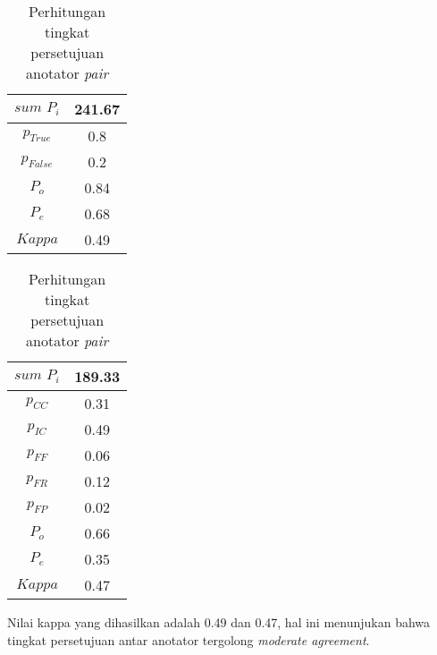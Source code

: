 \begin{table}
  \centering
  \caption{Perhitungan tingkat persetujuan anotator \textit{pair}}
  \label{table:pair-kappa}
  \begin{tabular}{|c|c|}
  \hline
  $sum\,\,P_i$ & 241.67 \\ \hline
  $p_{True}$ & 0.8 \\ \hline
  $p_{False}$ & 0.2 \\ \hline
  $P_o$ & 0.84 \\ \hline
  $P_e$ & 0.68 \\ \hline
  $Kappa$ & 0.49 \\ \hline
  \end{tabular} 
\end{table}

\begin{table}
  \centering
  \caption{Perhitungan tingkat persetujuan anotator \textit{pair}}
  \label{table:pair-kappa2}
  \begin{tabular}{|c|c|}
  \hline
  $sum\,\,P_i$ & 189.33 \\ \hline
  $p_{CC}$ & 0.31 \\ \hline
  $p_{IC}$ & 0.49 \\ \hline
  $p_{FF}$ & 0.06 \\ \hline
  $p_{FR}$ & 0.12 \\ \hline
  $p_{FP}$ & 0.02 \\ \hline
  $P_o$ & 0.66 \\ \hline
  $P_e$ & 0.35 \\ \hline
  $Kappa$ & 0.47 \\ \hline
  \end{tabular} 
\end{table}

\noindent Nilai kappa yang dihasilkan adalah 0.49 dan 0.47, hal ini menunjukan bahwa tingkat persetujuan antar anotator tergolong \textit{moderate agreement}. 

